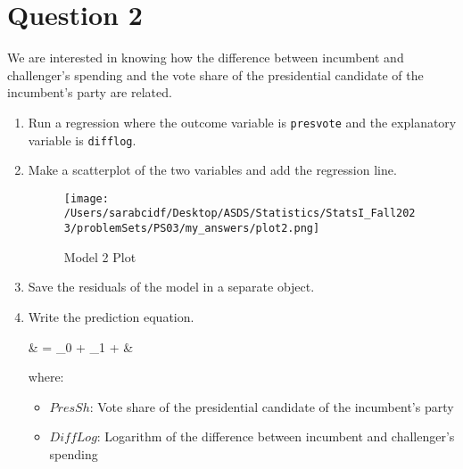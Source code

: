 \documentclass[12pt,letterpaper]{article}
\begin{document}
\newpage

\section*{Question 2}
\noindent We are interested in knowing how the difference between incumbent and challenger's spending and the vote share of the presidential candidate of the incumbent's party are related.	\vspace{.25cm}
	\begin{enumerate}
		\item Run a regression where the outcome variable is \texttt{presvote} and the explanatory variable is \texttt{difflog}.	\vspace{0.5cm}
		
		
		
		\item Make a scatterplot of the two variables and add the regression line. \vspace{0.5cm}
		
		
		
		\begin{figure}[H]
			\centering
			\texttt{[image: /Users/sarabcidf/Desktop/ASDS/Statistics/StatsI\_Fall2023/problemSets/PS03/my\_answers/plot2.png]}
			\caption{Model 2 Plot}
		\end{figure}
		
		\item Save the residuals of the model in a separate object.	\vspace{0.5cm}
		
		
		
		\item Write the prediction equation.
		
		{\setlength{\abovedisplayskip}{2pt} 
			\setlength{\belowdisplayskip}{6pt} 
			
			\begin{flalign*}
				& = \beta_0 + \beta_1 \cdot {} + \varepsilon &
			\end{flalign*}
			
			where: 
			
			\begin{itemize}
				\item $PresSh$: Vote share of the presidential candidate of the incumbent's party
				\item $DiffLog$: Logarithm of the difference between incumbent and challenger's spending
			\end{itemize}
		}
			
			
	\end{enumerate}
	
\end{document}
